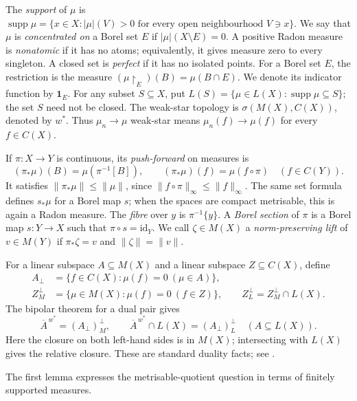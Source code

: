 \documentclass[a4paper,11pt]{amsart}
\theoremstyle{plain}
\theoremstyle{definition}
\theoremstyle{remark}
\newcommand{\supp}{\operatorname{supp}}
\newcommand{\one}{\mathbf 1}
\newcommand{\restr}[1]{{\restriction_{#1}}}
\numberwithin{equation}{section}
\begin{document}
The \emph{support} of $\mu$ is
$\supp\mu=\{x\in X:|\mu|(V)>0\text{ for every open neighbourhood }V\ni x\}$.
We say that $\mu$ is \emph{concentrated on} a Borel set $E$ if
$|\mu|(X\setminus E)=0$. A positive Radon measure is \emph{nonatomic}
if it has no atoms; equivalently, it gives measure zero to every singleton.
A closed set is \emph{perfect} if it has no isolated points.
For a Borel set $E$, the restriction is the measure
$(\mu\restr{E})(B)=\mu(B\cap E)$. We denote its indicator function by
$\one_E$. For any subset $S\subseteq X$, put
$L(S)=\{\mu\in L(X):\supp\mu\subseteq S\}$; the set $S$ need not be closed.
The weak-star topology is $\sigma(M(X),C(X))$, denoted by $w^*$.
Thus $\mu_n\to\mu$ weak-star means $\mu_n(f)\to\mu(f)$ for every $f\in C(X)$.

If $\pi:X\to Y$ is continuous, its \emph{push-forward} on measures is
\[
(\pi_*\mu)(B)=\mu(\pi^{-1}[B]),\qquad
(\pi_*\mu)(f)=\mu(f\circ\pi)\quad(f\in C(Y)).
\]
It satisfies $\|\pi_*\mu\|\leqslant\|\mu\|$, since
$\|f\circ\pi\|_\infty\leqslant\|f\|_\infty$.
The same set formula defines $s_*\mu$ for a Borel map $s$;
when the spaces are compact metrisable, this is again a Radon measure.
The \emph{fibre} over $y$ is $\pi^{-1}\{y\}$. A \emph{Borel section} of
$\pi$ is a Borel map $s:Y\to X$ such that $\pi\circ s=\mathrm{id}_Y$.
We call $\zeta\in M(X)$ a \emph{norm-preserving lift} of $v\in M(Y)$
if $\pi_*\zeta=v$ and $\|\zeta\|=\|v\|$.

For a linear subspace $A\subseteq M(X)$ and a linear subspace $Z\subseteq C(X)$, define
\[
\begin{split}
A_\perp&=\{f\in C(X):\mu(f)=0\ (\mu\in A)\},\\
Z_M^\perp&=\{\mu\in M(X):\mu(f)=0\ (f\in Z)\},\qquad
Z_L^\perp=Z_M^\perp\cap L(X).
\end{split}
\]
The bipolar theorem for a dual pair gives
\begin{equation}\label{eq:bipolar}
\overline A^{\,w^*}=(A_\perp)_M^\perp,\qquad
\overline A^{\,w^*}\cap L(X)=(A_\perp)_L^\perp\quad(A\subseteq L(X)).
\end{equation}
Here the closure on both left-hand sides is in $M(X)$; intersecting with $L(X)$ gives the relative closure. These are standard duality facts; see \cite[Chapter~8]{Jarchow}. 

The first lemma expresses the metrisable-quotient question in terms of
finitely supported measures.
\end{document}
